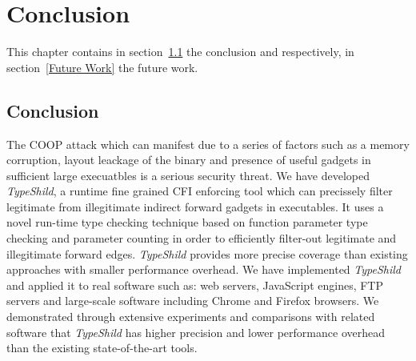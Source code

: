 \chapter{Conclusion}
\label{chapter:Conclusion}
This chapter contains in section~\ref{Conclusion} the conclusion and respectively,
in section~\ref{Future Work} the future work.

\section{Conclusion} 
\label{Conclusion} 

The COOP attack which can manifest due to a series of factors such as
a memory corruption, layout leackage of the binary and presence of useful
gadgets in sufficient large execuatbles is a serious security threat.
We have developed \textit{TypeShild}, a runtime fine grained CFI enforcing
tool which can precissely filter legitimate from illegitimate indirect forward
gadgets in executables.
It uses a novel run-time type checking technique based on function parameter
type checking and parameter counting in order to efficiently filter-out legitimate
and illegitimate forward edges.
\textit{TypeShild} provides more precise coverage than existing approaches with
smaller performance overhead.
We have implemented \textit{TypeShild} and applied it to real software such as:
web servers, JavaScript engines, FTP servers and 
large-scale software including Chrome and Firefox browsers.
We demonstrated through extensive experiments and comparisons with related software
that \textit{TypeShild} has higher precision and lower performance overhead than 
the existing state-of-the-art tools.



